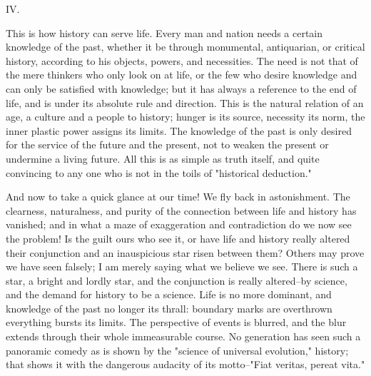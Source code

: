 IV.

This is how history can serve life. Every man and nation needs a
certain knowledge of the past, whether it be through monumental,
antiquarian, or critical history, according to his objects, powers,
and necessities. The need is not that of the mere thinkers who only
look on at life, or the few who desire knowledge and can only be
satisfied with knowledge; but it has always a reference to the end of
life, and is under its absolute rule and direction. This is the
natural relation of an age, a culture and a people to history; hunger
is its source, necessity its norm, the inner plastic power assigns
its limits. The knowledge of the past is only desired for the service
of the future and the present, not to weaken the present or undermine
a living future. All this is as simple as truth itself, and quite
convincing to any one who is not in the toils of "historical
deduction."

And now to take a quick glance at our time! We fly back in
astonishment. The clearness, naturalness, and purity of the
connection between life and history has vanished; and in what a maze
of exaggeration and contradiction do we now see the problem! Is the
guilt ours who see it, or have life and history really altered their
conjunction and an inauspicious star risen between them? Others may
prove we have seen falsely; I am merely saying what we believe we
see. There is such a star, a bright and lordly star, and the
conjunction is really altered--by science, and the demand for history
to be a science. Life is no more dominant, and knowledge of the past
no longer its thrall: boundary marks are overthrown everything bursts
its limits. The perspective of events is blurred, and the blur
extends through their whole immeasurable course. No generation has
seen such a panoramic comedy as is shown by the "science of universal
evolution," history; that shows it with the dangerous audacity of its
motto--"Fiat veritas, pereat vita."

